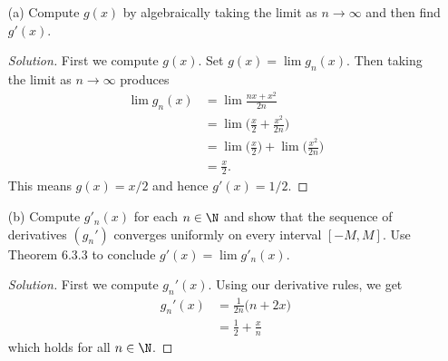 \begin{enumerate}
    \item[(a)] Compute \( g(x)  \) by algebraically taking the limit as \( n \to \infty  \) and then find \( g'(x)  \).
        \begin{proof}[Solution]
        First we compute \( g(x)  \). Set \( g(x) = \lim g_n(x)  \). Then taking the limit as \( n \to \infty  \) produces 
        \begin{align*}
            \lim g_n(x) &= \lim \frac{ nx + x^2 }{ 2n }  \\
                        &= \lim \Big( \frac{ x }{ 2 } + \frac{ x^2 }{ 2n }  \Big)\\
                        &= \lim \Big( \frac{ x  }{ 2 }  \Big) + \lim \Big( \frac{ x^2 }{ 2n }  \Big) \\
                        &= \frac{ x }{ 2 }.
        \end{align*}
        This means \( g(x) = x / 2  \) and hence \( g'(x) = 1 / 2  \).
        \end{proof}
    \item[(b)] Compute \( g'_n(x)  \) for each \( n \in \N  \) and show that the sequence of derivatives \( (g_n')  \) converges uniformly on every interval \( [-M,M ] \). Use Theorem 6.3.3 to conclude \( g'(x) = \lim g'_n(x)  \).
        \begin{proof}[Solution]
        First we compute \( g_n'(x) \). Using our derivative rules, we get 
        \begin{align*}
            g_n'(x) &= \frac{ 1 }{ 2n } \Big( n + 2x \Big) \\
                    &= \frac{ 1 }{ 2 } + \frac{ x }{ n }
        \end{align*}
        which holds for all \( n \in \N  \).


\end{proof}
\end{enumerate}
